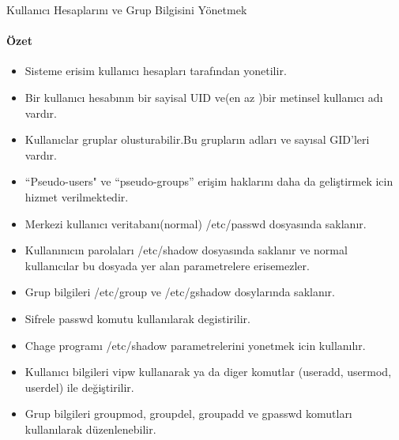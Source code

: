 \begin{section}{Kullanıcı Hesaplarını ve Grup Bilgisini Yönetmek}
\paragraph{Özet}{
\begin{itemize}
\item Sisteme erisim kullanıcı hesapları tarafından yonetilir.
\item Bir kullanıcı hesabının bir sayisal UID ve(en az )bir metinsel kullanıcı adı vardır.
\item Kullanıclar gruplar olusturabilir.Bu grupların adları ve sayısal GID'leri vardır.
\item “Pseudo-users" ve “pseudo-groups” erişim haklarını daha da geliştirmek icin hizmet verilmektedir.
\item Merkezi kullanıcı veritabanı(normal) /etc/passwd dosyasında saklanır.
\item Kullanınıcın parolaları /etc/shadow dosyasında saklanır ve normal kullanıcılar bu dosyada yer alan parametrelere erisemezler.
\item Grup bilgileri /etc/group ve /etc/gshadow dosylarında saklanır.
\item Sifrele passwd komutu kullanılarak degistirilir.
\item Chage programı /etc/shadow parametrelerini yonetmek icin kullanılır.
\item Kullanıcı bilgileri vipw kullanarak ya da diger komutlar (useradd, usermod, userdel) ile değiştirilir.
\item Grup bilgileri groupmod, groupdel, groupadd ve gpasswd komutları kullanılarak düzenlenebilir.
\end{itemize}}
\end{section}